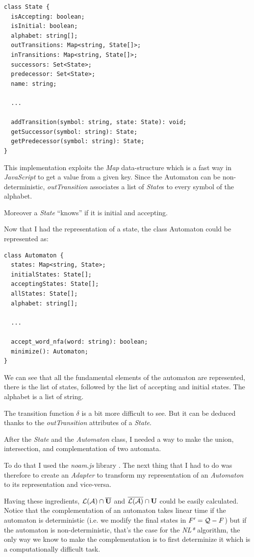 \begin{verbatim}
class State {
  isAccepting: boolean;
  isInitial: boolean;
  alphabet: string[];
  outTransitions: Map<string, State[]>;
  inTransitions: Map<string, State[]>;
  successors: Set<State>;
  predecessor: Set<State>;
  name: string;

  ... 

  addTransition(symbol: string, state: State): void;
  getSuccessor(symbol: string): State;
  getPredecessor(symbol: string): State;
}
\end{verbatim}

This implementation exploits the \textit{Map} data-structure which is a fast way in \textit{JavaScript} to get a value from a given key. Since the Automaton can be non-deterministic, \textit{outTransition} associates a list of \textit{State}s to every symbol of the alphabet.

Moreover a \textit{State} ``knows'' if it is initial and accepting.

Now that I had the representation of a state, the class Automaton could be represented as:

\begin{verbatim}
class Automaton {
  states: Map<string, State>;
  initialStates: State[];
  acceptingStates: State[];
  allStates: State[];
  alphabet: string[];

  ... 

  accept_word_nfa(word: string): boolean;
  minimize(): Automaton;
}
\end{verbatim}

We can see that all the fundamental elements of the automaton are represented, there is the list of states, followed by the list of accepting and initial states. The alphabet is a list of string.

The transition function $\delta$ is a bit more difficult to see. But it can be deduced thanks to the \textit{outTransition} attributes of a \textit{State}.

After the \textit{State} and the \textit{Automaton} class, I needed a way to make the union, intersection,  and complementation of two automata.

To do that I used the \textit{noam.js} library \cite{Noam}. The next thing that I had to do was therefore to create an \textit{Adapter} to transform my representation of an \textit{Automaton} to its representation and vice-versa.

Having these ingredients, $\mathcal{L}(\mathcal{A}) \cap \overline{\mathbf{U}}$ and $\overline{\mathcal{L}(\mathcal{A})} \cap \mathbf{U}$ could be easily calculated. Notice that the complementation of an automaton takes linear time if the automaton is deterministic (i.e. we modify the final states in $F' = \mathcal{Q} - F$) but if the automaton is non-deterministic, that's the case for the \textit{NL*} algorithm, the only way we know to make the complementation is to first determinize it which is a computationally difficult task.

